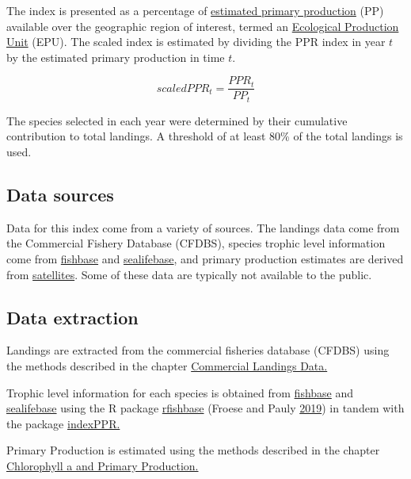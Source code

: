 \documentclass[
]{book}
\begin{document}
The index is presented as a percentage of \href{https://noaa-edab.github.io/tech-doc/chl-pp.html}{estimated primary production} (PP) available over the geographic region of interest, termed an \href{https://noaa-edab.github.io/tech-doc/comdat.html}{Ecological Production Unit} (EPU). The scaled index is estimated by dividing the PPR index in year \(t\) by the estimated primary production in time \(t\).

\[scaledPPR_t = \frac{PPR_t}{PP_t}\]

The species selected in each year were determined by their cumulative contribution to total landings. A threshold of at least 80\% of the total landings is used.

\hypertarget{data-sources-27}{%
\subsection{Data sources}\label{data-sources-27}}

Data for this index come from a variety of sources. The landings data come from the Commercial Fishery Database (CFDBS), species trophic level information come from \href{http://fishbase.de}{fishbase} and \href{http://sealifebase.ca}{sealifebase}, and primary production estimates are derived from \href{https://noaa-edab.github.io/tech-doc/chl-pp.html}{satellites}. Some of these data are typically not available to the public.

\hypertarget{data-extraction-24}{%
\subsection{Data extraction}\label{data-extraction-24}}

Landings are extracted from the commercial fisheries database (CFDBS) using the methods described in the chapter \href{https://noaa-edab.github.io/tech-doc/comdat.html}{Commercial Landings Data.}

Trophic level information for each species is obtained from \href{http://fishbase.de}{fishbase} and \href{http://sealifebase.ca}{sealifebase} using the R package \href{https://github.com/ropensci/rfishbase}{rfishbase} (Froese and Pauly \protect\hyperlink{ref-froese2019fishbase}{2019}) in tandem with the package \href{https://github.com/andybeet/indexPPR/}{indexPPR.}

Primary Production is estimated using the methods described in the chapter \href{https://noaa-edab.github.io/tech-doc/chl-pp.html}{Chlorophyll a and Primary Production.}
\end{document}
